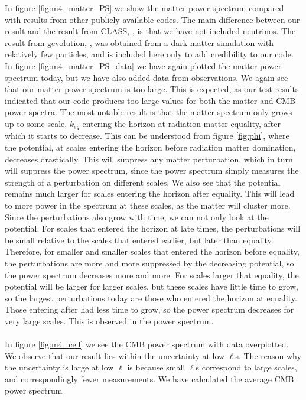 \documentclass{aa}
\begin{document}
In figure \ref{fig:m4_matter_PS} we show the matter power spectrum compared with results from other publicly available codes. The main difference between our result and
the result from CLASS, \cite{CLASS}, is that we have not included neutrinos. The result from gevolution, \cite{gevolution},
was obtained from a dark matter simulation with relatively few particles, and is included
here only to add credibility to our code. In figure \ref{fig:m4_matter_PS_data} we have again plotted the matter power spectrum today, but we have also added data from observations.
We again see that our matter power spectrum is too large. This is expected, as our test results indicated that our code produces too large values for both the matter and CMB power spectra. The most 
notable result is that the matter spectrum only grows up to some scale, $k_{eq}$ entering the horizon at radiation matter equality, after which it starts to decrease.
This can be understood from figure \ref{fig:phi}, where the potential, at scales 
entering the horizon before radiation matter domination, decreases drastically. This will suppress any matter perturbation, which in turn will suppress the power spectrum,
since the power spectrum simply measures the strength of a perturbation on different scales. We also see that the potential remains much larger for scales entering the horizon after equality.
This will lead to more power in the spectrum at these scales, as the matter will cluster more. Since the perturbations also grow with time, we can not only look at the potential. For scales that entered the horizon at late times,
the perturbations will be small relative to the scales that entered earlier, but later than equality. Therefore, for smaller and smaller scales that entered the horizon before equality, the perturbations are more and more suppressed by the decreasing potential, so the power spectrum decreases more and more.
For scales larger that equality, the potential will be larger for larger scales, but these scales have little time to grow, so the largest perturbations today are those who entered the horizon at equality. Those entering after had less time to grow, so the power spectrum decreases for very large scales.
This is observed in the power spectrum.\\
\\
In figure \ref{fig:m4_cell} we see the CMB power spectrum with data overplotted. We observe that our result lies within the uncertainty at low $\ell$s. The reason why the
uncertainty is large at low $\ell$ is because small $\ell$s correspond to large scales, and correspondingly fewer measurements. We have calculated the average CMB power spectrum
\end{document}
